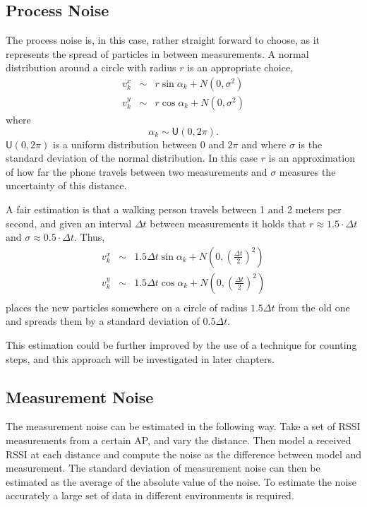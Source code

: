 \documentclass{LTHthesis}
\begin{document}
\subsection{Process Noise}  
%
The process noise is, in this case, rather straight forward to choose, as it represents the spread of particles in between measurements. A normal distribution around a circle with radius $r$ is an appropriate choice,
%
\begin{eqnarray}
v^x_k &\sim &r\sin{\alpha_k}+N(0,\sigma^2)\\
v^y_k &\sim &r\cos{\alpha_k}+N(0,\sigma^2)
\end{eqnarray}
%
where
%
\begin{equation}
\alpha_k \sim \mathsf U(0,2\pi).
\end{equation}
%
$\mathsf{U}(0,2\pi)$ is a uniform distribution between $0$ and $2\pi$ and where $\sigma$ is the standard deviation of the normal distribution. In this case $r$ is an approximation of how far the phone travels between two measurements and $\sigma$ measures the uncertainty of this distance. 

A fair estimation is that a walking person travels between 1 and 2 meters per second, and given an interval $\Delta t$ between measurements it holds that $r \approx 1.5\cdot\Delta t$ and $\sigma \approx 0.5\cdot\Delta t$. Thus,
%
\begin{eqnarray}
v^x_k&\sim &1.5\Delta t \sin{\alpha_k} + N \left(0, \left(\frac{\Delta t}{2}\right)^2\right)\\
v^y_k&\sim &1.5\Delta t \cos{\alpha_k} + N \left(0, \left(\frac{\Delta t}{2}\right)^2\right)\\
\end{eqnarray}
places the new particles somewhere on a circle of radius $1.5\Delta t$ from the old one and spreads them by a standard deviation of $0.5\Delta t$.

This estimation could be further improved by the use of a technique for counting steps, and this approach will be investigated in later chapters.    
%
\subsection{Measurement Noise}
%
The measurement noise can be estimated in the following way. Take a set of RSSI measurements from a certain AP, and vary the distance. Then model a received RSSI at each distance and compute the noise as the difference between model and measurement. The standard deviation of measurement noise can then be estimated as the average of the absolute value of the noise. To estimate the noise accurately a large set of data in different environments is required.
\end{document}
